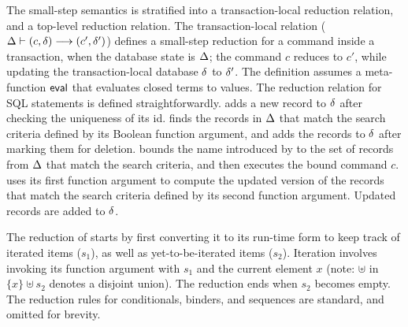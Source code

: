 The small-step semantics is stratified into a transaction-local
reduction relation, and a top-level reduction relation. The
transaction-local relation ($\Delta \vdash (c,\delta) \longrightarrow
(c',\delta')$) defines a small-step reduction for a command inside a
transaction, when the database state is $\Delta$; the command $c$
reduces to $c'$, while updating the transaction-local database $\delta$
to $\delta'$. The definition assumes a meta-function $\textsf{eval}$ that
evaluates closed terms to values. The reduction relation for SQL
statements is defined straightforwardly.  adds a new record
to $\delta$ after checking the uniqueness of its id.  finds
the records in $\Delta$ that match the search criteria defined by its
Boolean function argument, and adds the records to $\delta$ after
marking them for deletion.  bounds the name introduced by
 to the set of records from $\Delta$ that match the search
criteria, and then executes the bound command $c$.  uses its
first function argument to compute the updated version of the records
that match the search criteria defined by its second function
argument. Updated records are added to $\delta$.

The reduction of  starts by first converting it to its
run-time form to keep track of iterated items ($s_1$), as well as
yet-to-be-iterated items ($s_2$).  Iteration involves invoking its
function argument with $s_1$ and the current element $x$ (note:
$\uplus$ in $\{x\} \uplus s_2$ denotes a disjoint union). The
reduction ends when $s_2$ becomes empty. The reduction rules for
conditionals,  binders, and sequences are standard, and
omitted for brevity.


